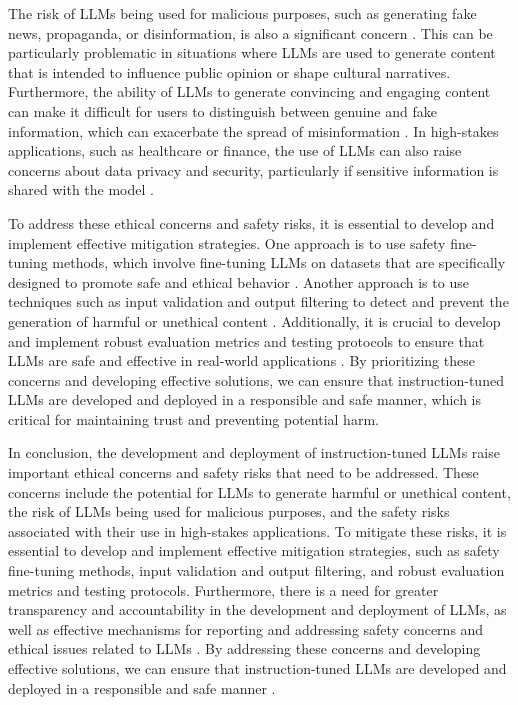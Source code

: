 \documentclass[11pt]{article}
\begin{document}
The risk of LLMs being used for malicious purposes, such as generating fake news, propaganda, or disinformation, is also a significant concern \cite{ref119}. This can be particularly problematic in situations where LLMs are used to generate content that is intended to influence public opinion or shape cultural narratives. Furthermore, the ability of LLMs to generate convincing and engaging content can make it difficult for users to distinguish between genuine and fake information, which can exacerbate the spread of misinformation \cite{ref120}. In high-stakes applications, such as healthcare or finance, the use of LLMs can also raise concerns about data privacy and security, particularly if sensitive information is shared with the model \cite{ref121}.

To address these ethical concerns and safety risks, it is essential to develop and implement effective mitigation strategies. One approach is to use safety fine-tuning methods, which involve fine-tuning LLMs on datasets that are specifically designed to promote safe and ethical behavior \cite{ref122}. Another approach is to use techniques such as input validation and output filtering to detect and prevent the generation of harmful or unethical content \cite{ref123}. Additionally, it is crucial to develop and implement robust evaluation metrics and testing protocols to ensure that LLMs are safe and effective in real-world applications \cite{ref20}. By prioritizing these concerns and developing effective solutions, we can ensure that instruction-tuned LLMs are developed and deployed in a responsible and safe manner, which is critical for maintaining trust and preventing potential harm.

In conclusion, the development and deployment of instruction-tuned LLMs raise important ethical concerns and safety risks that need to be addressed. These concerns include the potential for LLMs to generate harmful or unethical content, the risk of LLMs being used for malicious purposes, and the safety risks associated with their use in high-stakes applications. To mitigate these risks, it is essential to develop and implement effective mitigation strategies, such as safety fine-tuning methods, input validation and output filtering, and robust evaluation metrics and testing protocols. Furthermore, there is a need for greater transparency and accountability in the development and deployment of LLMs, as well as effective mechanisms for reporting and addressing safety concerns and ethical issues related to LLMs \cite{ref124}. By addressing these concerns and developing effective solutions, we can ensure that instruction-tuned LLMs are developed and deployed in a responsible and safe manner \cite{ref125}.
\end{document}
